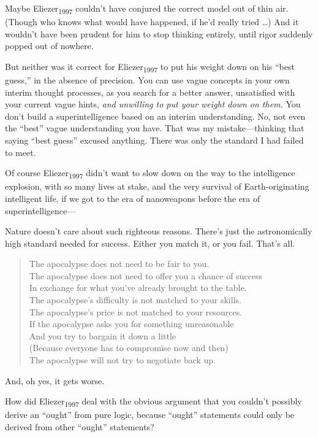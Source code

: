 {
 Maybe Eliezer\textsubscript{1997} couldn't have
conjured the correct model out of thin air. (Though who knows what
would have happened, if he'd really tried \ldots) And it
wouldn't have been prudent for him to stop thinking
entirely, until rigor suddenly popped out of nowhere.}

{
 But neither was it correct for Eliezer\textsubscript{1997} to put
his weight down on his ``best
guess,'' in the absence of precision. You can use
vague concepts in your own interim thought processes, as you search for
a better answer, unsatisfied with your current vague hints, \textit{and
unwilling to put your weight down on them.} You don't
build a superintelligence based on an interim understanding. No, not
even the ``best'' vague
understanding you have. That was my mistake---thinking that saying
``best guess'' excused anything.
There was only the standard I had failed to meet.}

{
 Of course Eliezer\textsubscript{1997} didn't want
to slow down on the way to the intelligence explosion, with so many
lives at stake, and the very survival of Earth-originating intelligent
life, if we got to the era of nanoweapons before the era of
superintelligence---}

{
 Nature doesn't care about such righteous reasons.
There's just the astronomically high standard needed
for success. Either you match it, or you fail. That's
all.}

\begin{verse}
 The apocalypse does not need to be fair to you.\\
 The apocalypse does not need to offer you a chance of success\\
 In exchange for what you've already brought to the
table.\\
 The apocalypse's difficulty is not matched to your
skills.\\
 The apocalypse's price is not matched to your
resources.\\
 If the apocalypse asks you for something unreasonable\\
 And you try to bargain it down a little\\
 (Because everyone has to compromise now and then)\\
 The apocalypse will not try to negotiate back up.\\
\end{verse}

{
 And, oh yes, it gets worse.}

{
 How did Eliezer\textsubscript{1997} deal with the obvious argument
that you couldn't possibly derive an
``ought'' from pure logic, because
``ought'' statements could only be
derived from other ``ought''
statements?}

